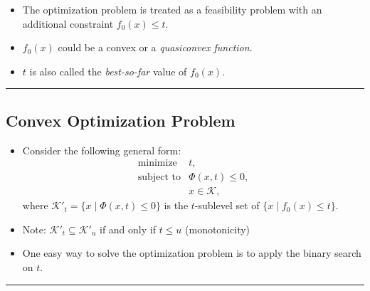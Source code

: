 \documentclass[
]{article}
\begin{document}
\begin{itemize}
\item
  The optimization problem is treated as a feasibility problem with an
  additional constraint \(f_0(x) \le t\).
\item
  \(f_0(x)\) could be a convex or a \emph{quasiconvex function}.
\item
  \(t\) is also called the \emph{best-so-far} value of \(f_0(x)\).
\end{itemize}

\begin{center}\rule{0.5\linewidth}{0.5pt}\end{center}

\subsection{Convex Optimization
Problem}\label{convex-optimization-problem}

\begin{itemize}
\item
  Consider the following general form: \[\begin{array}{ll}
    \text{minimize}     & t, \\
    \text{subject to}   & \Phi(x, t) \le 0, \\
    & x \in \mathcal{K},
  \end{array}\] where \(\mathcal{K}'_t = \{x \mid \Phi(x, t) \le 0\}\)
  is the \(t\)-sublevel set of \(\{x \mid f_0(x) \le t\}\).
\item
  Note: \(\mathcal{K'}_t \subseteq \mathcal{K'}_u\) if and only if
  \(t \le u\) (monotonicity)
\item
  One easy way to solve the optimization problem is to apply the binary
  search on \(t\).
\end{itemize}

\begin{center}\rule{0.5\linewidth}{0.5pt}\end{center}
\end{document}
